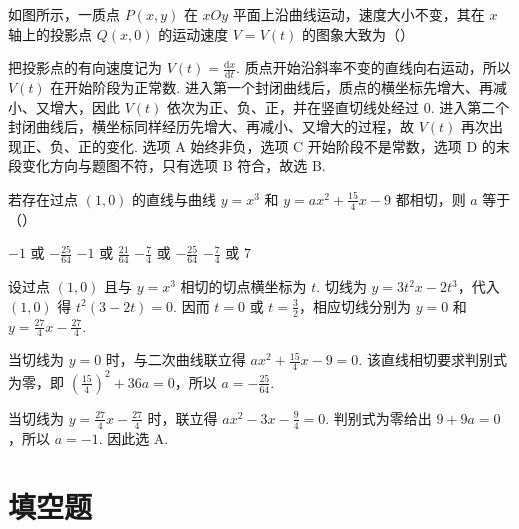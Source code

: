 \begin{problem}
如图所示，一质点 \(P(x, y)\) 在 \(xOy\) 平面上沿曲线运动，速度大小不变，其在 \(x\) 轴上的投影点 \(Q(x, 0)\) 的运动速度 \(V = V(t)\) 的图象大致为（\quad）

    {}
    {}
    {}
\begin{solution}
把投影点的有向速度记为 \(V(t)=\frac{\mathrm dx}{\mathrm dt}\). 质点开始沿斜率不变的直线向右运动，所以 \(V(t)\) 在开始阶段为正常数. 进入第一个封闭曲线后，质点的横坐标先增大、再减小、又增大，因此 \(V(t)\) 依次为正、负、正，并在竖直切线处经过 \(0\). 进入第二个封闭曲线后，横坐标同样经历先增大、再减小、又增大的过程，故 \(V(t)\) 再次出现正、负、正的变化. 选项 A 始终非负，选项 C 开始阶段不是常数，选项 D 的末段变化方向与题图不符，只有选项 B 符合，故选 B.
\end{solution}
\end{problem}

\begin{problem}
若存在过点 \((1,0)\) 的直线与曲线 \( y = x^3 \) 和 \( y = ax^2 + \frac{15}{4} x - 9 \) 都相切，则 \( a \) 等于（\quad）

\choices
    {\(-1\) 或 \( -\frac{25}{64} \)}
    {\(-1\) 或 \( \frac{21}{64} \)}
    {\(-\frac{7}{4}\) 或 \(-\frac{25}{64}\)}
    {\(-\frac{7}{4}\) 或 \(7\)}
\begin{solution}
设过点 \((1,0)\) 且与 \(y=x^{3}\) 相切的切点横坐标为 \(t\). 切线为
\(y=3t^{2}x-2t^{3}\)，代入 \((1,0)\) 得 \(t^{2}(3-2t)=0\). 因而 \(t=0\) 或 \(t=\frac32\)，相应切线分别为 \(y=0\) 和 \(y=\frac{27}{4}x-\frac{27}{4}\).

当切线为 \(y=0\) 时，与二次曲线联立得 \(ax^{2}+\frac{15}{4}x-9=0\). 该直线相切要求判别式为零，即
\(\left(\frac{15}{4}\right)^{2}+36a=0\)，所以 \(a=-\frac{25}{64}\).

当切线为 \(y=\frac{27}{4}x-\frac{27}{4}\) 时，联立得 \(ax^{2}-3x-\frac94=0\). 判别式为零给出 \(9+9a=0\)，所以 \(a=-1\). 因此选 A.
\end{solution}
\end{problem}

\section{填空题}

